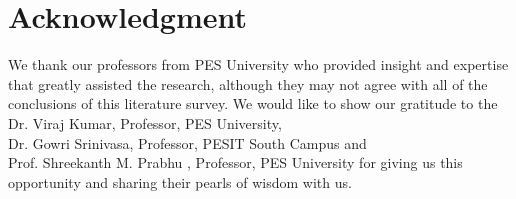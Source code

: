 \documentclass[conference]{IEEEtran}
\begin{document}
	\section*{Acknowledgment}
 We thank our professors from PES University who provided insight and expertise that greatly assisted the research, although they may not agree with all of the conclusions of this literature survey. We would like to show our gratitude to the Dr. Viraj Kumar, Professor, PES University,\\  Dr. Gowri Srinivasa, Professor, PESIT South Campus and \\ Prof. Shreekanth M. Prabhu , Professor, PES University for giving us this opportunity and sharing their pearls of wisdom with us.


\end{document}
